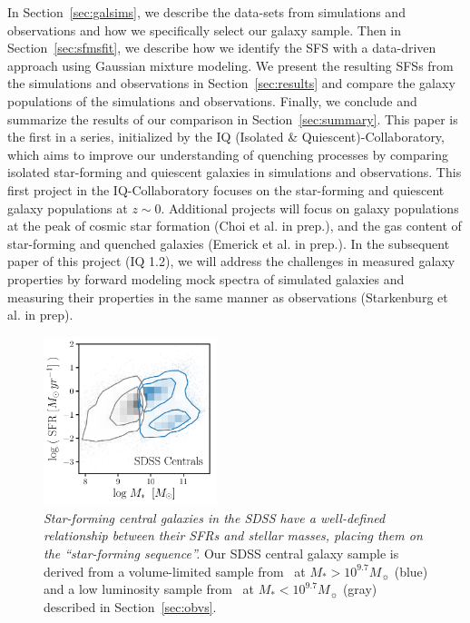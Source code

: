 \documentclass[tighten, preprint]{aastex62}
\newcommand{\todo}[1]{{\bf \textcolor{red}{ #1}}}
\begin{document}
In Section~\ref{sec:galsims}, we describe the data-sets from simulations
and observations and how we specifically select our galaxy sample. 
Then in Section~\ref{sec:sfmsfit}, we describe how we identify the SFS 
with a data-driven approach using Gaussian mixture modeling. We present 
the resulting SFSs from the simulations and observations in 
Section~\ref{sec:results} and compare the galaxy populations
of the simulations and observations. Finally, we conclude and summarize
the results of our comparison in Section~\ref{sec:summary}.
This paper is the first in a series, initialized by the IQ (Isolated 
\& Quiescent)-Collaboratory, which aims to improve our understanding 
of quenching processes by comparing isolated star-forming 
and quiescent galaxies in simulations and observations. This first 
project in the IQ-Collaboratory focuses on the star-forming and quiescent 
galaxy populations at $z\sim 0$. Additional projects will focus on galaxy 
populations at the peak of cosmic star formation (Choi et al. in prep.), 
and the gas content of star-forming and quenched galaxies (Emerick et al. 
in prep.).  %
In the subsequent paper of this project (IQ 1.2), we will address the challenges 
in measured galaxy properties by forward modeling mock spectra of simulated 
galaxies and measuring their properties in the same manner as observations 
(Starkenburg et al. in prep).


\begin{figure}
\begin{center}
\includegraphics[width=0.45\textwidth]{Obvs_SFR_Mstar.pdf} 
\caption{\emph{Star-forming central galaxies in the SDSS 
have a well-defined relationship between their SFRs and stellar masses, 
placing them on the ``star-forming sequence''.} Our SDSS central galaxy 
sample is derived from a volume-limited sample from~\cite{tinker2011} 
at $M_* > 10^{9.7} M_\sun$ (blue) and a low luminosity sample 
from~\cite{geha2012} at $M_* < 10^{9.7} M_\sun$ (gray) described in 
Section~\ref{sec:obvs}.
}
\label{fig:sfrmstar_sdss}
\end{center}
\end{figure}
\end{document}
